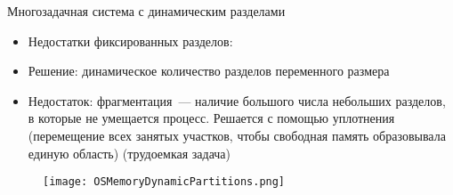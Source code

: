 \documentclass[aspectratio=169,14pt]{beamer}
\begin{document}
\begin{frame}{Многозадачная система с динамическим разделами}
    \begin{footnotesize}
    \begin{spacing}{0.8}
    \begin{itemize}
        \item Недостатки фиксированных разделов:
        \begin{itemize}
        \end{itemize}
        \item Решение: динамическое количество разделов переменного размера
        \begin{itemize}
        \end{itemize}
        \item Недостаток: фрагментация~--- наличие большого числа небольших
        разделов, в которые не умещается процесс. Решается с помощью
        уплотнения (перемещение всех занятых участков, чтобы свободная
        память образовывала единую область) (трудоемкая задача)
    \end{itemize}
    \begin{figure}[htp]
        \centering
        \texttt{[image: OSMemoryDynamicPartitions.png]}
    \end{figure}
    \end{spacing}
    \end{footnotesize}

\end{frame}
\end{document}
